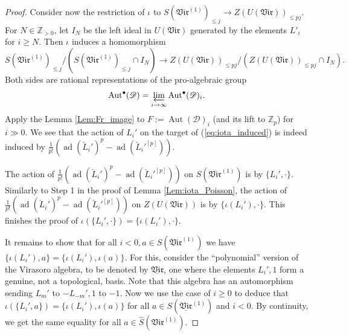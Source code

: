 \documentclass{amsart}
\theoremstyle{definition}
\newcommand{\D}{\sD}
\newcommand{\sD}{\mathscr{D}}
\newcommand{\Z}{\mathbb{Z}}
\numberwithin{equation}{section}
\begin{document}
\begin{proof}
Consider now the restriction of $\iota$ 
to $S(\mathfrak{Vir}^{(1)})_{\leqslant j}\rightarrow Z(U(\mathfrak{Vir}))_{\leqslant pj}$. For $N\in \Z_{>0}$, let $I_N$ be the left ideal in $U(\mathfrak{Vir})$ generated by the elements $L'_i$ for $i\geqslant N$. Then $\iota$ induces a homomorphism
\begin{equation}\label{eq:iota_induced}
S(\mathfrak{Vir}^{(1)})_{\leqslant j}/(S(\mathfrak{Vir}^{(1)})_{\leqslant j}\cap I_N)\rightarrow Z(U(\mathfrak{Vir}))_{\leqslant pj}/
(Z(U(\mathfrak{Vir}))_{\leqslant pj}\cap I_N).
\end{equation}
Both sides are rational representations of the pro-algebraic group%
$$\operatorname{Aut}^\bullet(\D)=\varprojlim_{i\rightarrow \infty}
\operatorname{Aut}^\bullet(\D)_i.$$ Apply the Lemma \ref{Lem:Fr_image} to $F:=\operatorname{Aut}(\D)_i$ (and its lift to $\Z_p$) for $i\gg 0$.
We see that the action of $L_i'$ on the target of
(\ref{eq:iota_induced}) is indeed induced by 
$\frac{1}{p!}(\operatorname{ad}(\breve{L}_i')^p-\operatorname{ad}(\breve{L}_i'^{[p]}))$. 

The action of $\frac{1}{p!}(\operatorname{ad}(\breve{L}_i')^p-\operatorname{ad}(\breve{L}_i'^{[p]}))$ on $S(\mathfrak{Vir}^{(1)})$
is by $\{L_i',\cdot\}$. Similarly to Step 1 in the proof of Lemma \ref{Lem:iota_Poisson}, the action of $\frac{1}{p!}(\operatorname{ad}(\breve{L}_i')^p-\operatorname{ad}(\breve{L}_i'^{[p]}))$ on $Z(U(\mathfrak{Vir}))$ is by $\{\iota(L_i'),\cdot\}$. This finishes the proof of  $\iota(\{L_i',\cdot\})=\{\iota(L_i'),\cdot\}$.

It remains to show that for all $i<0, a\in S(\mathfrak{Vir}^{(1)})$ we have 
$\{\iota(L_i'),a\}=\{\iota(L_i'),\iota(a)\}$. For this, consider the ``polynomial'' version of the Virasoro algebra, to be denoted by $\underline{\mathfrak{Vir}}$, one where the elements $L_i',1$
form a genuine, not a topological, basis. Note that this algebra has an automorphism sending $L_m'$ to $-L_{-m}', 1$ to $-1$. Now we use the case of 
$i\geqslant 0$ to deduce that $\iota(\{L_i',a\})=\{\iota(L_i'),\iota(a)\}$
for all $a\in S(\underline{\mathfrak{Vir}}^{(1)})$ and $i<0$. By continuity, we get the same equality for all $a\in \widehat{S}(\mathfrak{Vir}^{(1)})$.
\end{proof}
\end{document}
